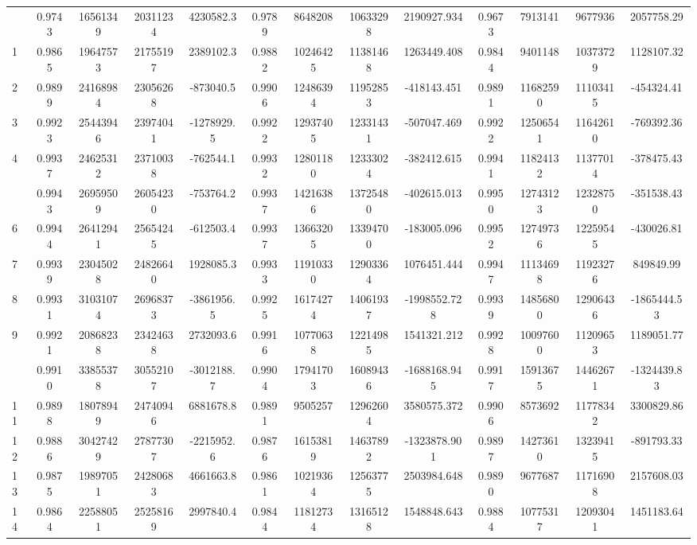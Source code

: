 \documentclass[
  12pt,
]{article}
\begin{document}
\begin{longtable}[t]{lcccccccccccc}
\endfoot
\bottomrule
\endlastfoot
0 & 0.9743 & 16561349 & 20311234 & 4230582.3 & 0.9789 & 8648208 & 10633298 & 2190927.934 & 0.9673 & 7913141 & 9677936 & 2057758.29\\
1 & 0.9865 & 19647573 & 21755197 & 2389102.3 & 0.9882 & 10246425 & 11381468 & 1263449.408 & 0.9844 & 9401148 & 10373729 & 1128107.32\\
2 & 0.9899 & 24168984 & 23056268 & -873040.5 & 0.9906 & 12486394 & 11952853 & -418143.451 & 0.9891 & 11682590 & 11103415 & -454324.41\\
3 & 0.9923 & 25443946 & 23974041 & -1278929.5 & 0.9922 & 12937405 & 12331431 & -507047.469 & 0.9922 & 12506541 & 11642610 & -769392.36\\
4 & 0.9937 & 24625312 & 23710038 & -762544.1 & 0.9932 & 12801180 & 12333024 & -382412.615 & 0.9941 & 11824132 & 11377014 & -378475.43\\
\addlinespace
5 & 0.9943 & 26959509 & 26054230 & -753764.2 & 0.9937 & 14216386 & 13725480 & -402615.013 & 0.9950 & 12743123 & 12328750 & -351538.43\\
6 & 0.9944 & 26412941 & 25654245 & -612503.4 & 0.9937 & 13663205 & 13394700 & -183005.096 & 0.9952 & 12749736 & 12259545 & -430026.81\\
7 & 0.9939 & 23045028 & 24826640 & 1928085.3 & 0.9933 & 11910330 & 12903364 & 1076451.444 & 0.9947 & 11134698 & 11923276 & 849849.99\\
8 & 0.9931 & 31031074 & 26968373 & -3861956.5 & 0.9925 & 16174274 & 14061937 & -1998552.728 & 0.9939 & 14856800 & 12906436 & -1865444.53\\
9 & 0.9921 & 20868238 & 23424638 & 2732093.6 & 0.9916 & 10770638 & 12214985 & 1541321.212 & 0.9928 & 10097600 & 11209653 & 1189051.77\\
\addlinespace
10 & 0.9910 & 33855378 & 30552107 & -3012188.7 & 0.9904 & 17941703 & 16089436 & -1688168.945 & 0.9917 & 15913675 & 14462671 & -1324439.83\\
11 & 0.9898 & 18078949 & 24740946 & 6881678.8 & 0.9891 & 9505257 & 12962604 & 3580575.372 & 0.9906 & 8573692 & 11778342 & 3300829.86\\
12 & 0.9886 & 30427429 & 27877307 & -2215952.6 & 0.9876 & 16153819 & 14637892 & -1323878.901 & 0.9897 & 14273610 & 13239415 & -891793.33\\
13 & 0.9875 & 19897051 & 24280683 & 4661663.8 & 0.9861 & 10219364 & 12563775 & 2503984.648 & 0.9890 & 9677687 & 11716908 & 2157608.03\\
14 & 0.9864 & 22588051 & 25258169 & 2997840.4 & 0.9844 & 11812734 & 13165128 & 1548848.643 & 0.9884 & 10775317 & 12093041 & 1451183.64\\

\end{longtable}
\end{document}
